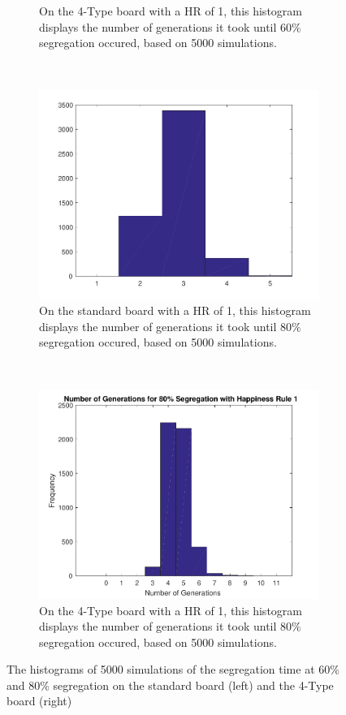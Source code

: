 \begin{figure}[H]
\begin{subfigure}{0.35\textwidth}
    \caption{On the 4-Type board with a HR of 1, this histogram  displays the number of generations it took until $60\%$ segregation occured, based on 5000 simulations.}
    \label{fig:segaantgen_460}
\end{subfigure}
~
\begin{subfigure}{0.35\textwidth}
    \includegraphics[width=\textwidth]{./60_80_segregation_aantgen/80_segregation.pdf}
    \caption{On the standard board with a HR of 1, this histogram  displays the number of generations it took until $80\%$ segregation occured, based on 5000 simulations.}
    \label{fig:segaantgen_s80}
\end{subfigure}
~
\begin{subfigure}{0.35\textwidth}
    \includegraphics[width=\textwidth]{./60_80_segregation_aantgen/4TypeBoard/80_segregation.pdf}
    \caption{On the 4-Type board with a HR of 1, this histogram  displays the number of generations it took until $80\%$ segregation occured, based on 5000 simulations.}
    \label{fig:segaantgen_480}
\end{subfigure}
\caption{The histograms of 5000 simulations of the segregation time at 60\% and 80\% segregation on the standard board (left) and the 4-Type board (right)}
\label{fig:histseg}
\end{figure}

